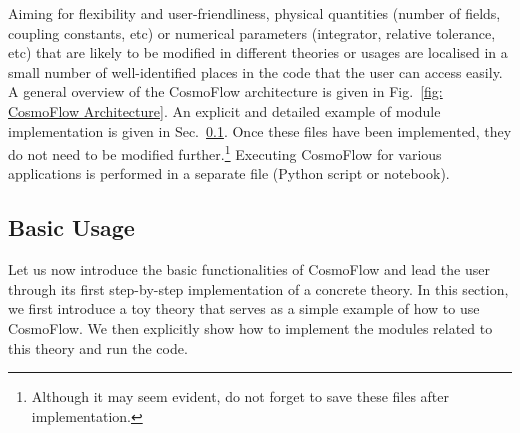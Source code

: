 \documentclass[11pt]{article}
\numberwithin{equation}{section} %
\begin{document}
Aiming for flexibility and user-friendliness, physical quantities (number of fields, coupling constants, etc) or numerical parameters (integrator, relative tolerance, etc) that are likely to be modified in different theories or usages are localised in a small number of well-identified places in the code that the user can access easily. A general overview of the \textsf{CosmoFlow} architecture is given in Fig.~\ref{fig: CosmoFlow Architecture}. An explicit and detailed example of module implementation is given in Sec.~\ref{subsec: Basic Usage}. Once these files have been implemented, they do not need to be modified further.\footnote{Although it may seem evident, do not forget to save these files after implementation.} Executing \textsf{CosmoFlow} for various applications is performed in a separate file (Python script or notebook).


\subsection{Basic Usage}
\label{subsec: Basic Usage}

Let us now introduce the basic functionalities of \textsf{CosmoFlow} and lead the user through its first step-by-step implementation of a concrete theory. In this section, we first introduce a toy theory that serves as a simple example of how to use \textsf{CosmoFlow}. We then explicitly show how to implement the modules related to this theory and run the code.
\end{document}
